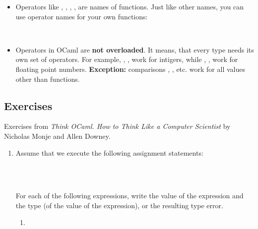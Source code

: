 \documentclass{beamer}
\newcommand{\tmem}[1]{{\em #1\/}}
\newcommand{\tmstrong}[1]{\textbf{#1}}
\newcommand{\tmverbatim}[1]{\text{{\ttfamily{#1}}}}
\begin{document}
{{\begin{itemize}
  \item Operators like \tmverbatim{+}, \tmverbatim{*}, \tmverbatim{<},
  \tmverbatim{=}, are names of functions. Just like other names, you can use
  operator names for your own functions:
  
  {}{\hlopt{(+:) }}{}{\hlopt{=
  }}{}{}{}{}{\hlstd{
  }}{\hlopt{[}}{}{\hlopt{;
  }}{}{\hlopt{];;}}{}\\
  {}{\hlstd{ }}{\hlopt{+:
  }}{}{\hlopt{;;}}{}
  
  \item Operators in OCaml are {\tmstrong{not overloaded}}. It means, that
  every type needs its own set of operators. For example, {\hlopt{+}},
  {\hlopt{*}}, {\hlopt{/}} work for intigers, while {},
  {}, {} work for floating point numbers.
  {\tmstrong{Exception:}} comparisons {\hlopt{<}}, {\hlopt{=}}, etc. work for
  all values other than functions.
\end{itemize}}{\begin{frame}
  \section{Exercises}
  
  Exercises from {\tmem{Think OCaml. How to Think Like a Computer Scientist}}
  by Nicholas Monje and Allen Downey.
  \begin{enumerate}
    \item Assume that we execute the following assignment statements:
    
    {\hlstd{}}{}{}{\hlopt{=
    }}{\hlstd{}}{}{\hlstd{}}{\hlopt{;;}}{\hlendline{}}\\
    {\hlstd{}}{}{}{\hlopt{=
    }}{\hlstd{}}{}{\hlstd{}}{\hlopt{;;}}{\hlendline{}}\\
    {\hlstd{}}{}{}{\hlopt{=
    }}{\hlstd{}}{}{\hlstd{}}{\hlopt{;;}}{\hlstd{}}{\hlendline{}}
    
    For each of the following expressions, write the value of the expression
    and the type (of the value of the expression), or the resulting type
    error.
    \begin{enumerate}
      \item {}{\hlopt{/}}{}
      

\end{enumerate}
\end{enumerate}
\end{frame}}}
\end{document}
